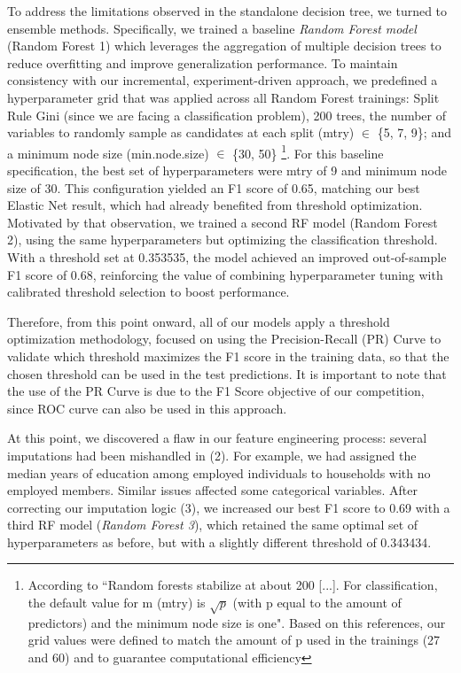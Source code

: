 \documentclass[12pt,a4paper,onecolumn]{article}
\begin{document}
To address the limitations observed in the standalone decision tree, we turned to ensemble methods. Specifically, we trained a baseline \textit{Random Forest model} (Random Forest 1) which leverages the aggregation of multiple decision trees to reduce overfitting and improve generalization performance. To maintain consistency with our incremental, experiment-driven approach, we predefined a hyperparameter grid that was applied across all Random Forest trainings: Split Rule Gini (since we are facing a classification problem), 200 trees, the number of variables to randomly sample as candidates at each split (mtry) $\in$ \{5, 7, 9\}; and a minimum node size (min.node.size) $\in$ \{30, 50\} \footnote{According to \citet{HastieTibshiraniFriedman2009} ``Random forests stabilize at about 200 [...]. For classification, the default value for m (mtry) is $\sqrt{p}$ (with p equal to the amount of predictors) and the minimum node size is one". Based on this references, our grid values were defined to match the amount of p used in the trainings (27 and 60) and to guarantee computational efficiency}. For this baseline specification, the best set of hyperparameters were mtry of 9 and minimum node size of 30. This configuration yielded an F1 score of 0.65, matching our best Elastic Net result, which had already benefited from threshold optimization. Motivated by that observation, we trained a second RF model (Random Forest 2), using the same hyperparameters but optimizing the classification threshold. With a threshold set at 0.353535, the model achieved an improved out-of-sample F1 score of 0.68, reinforcing the value of combining hyperparameter tuning with calibrated threshold selection to boost performance.

Therefore, from this point onward, all of our models apply a threshold optimization methodology, focused on using the Precision-Recall (PR) Curve to validate which threshold maximizes the F1 score in the training data, so that the chosen threshold can be used in the test predictions. It is important to note that the use of the PR Curve is due to the F1 Score objective of our competition, since ROC curve can also be used in this approach.

At this point, we discovered a flaw in our feature engineering process: several imputations had been mishandled in (2). For example, we had assigned the median years of education among employed individuals to households with no employed members. Similar issues affected some categorical variables. After correcting our imputation logic (3), we increased our best F1 score to 0.69 with a third RF model (\textit{Random Forest 3}), which retained the same optimal set of hyperparameters as before, but with a slightly different threshold of 0.343434.
\end{document}

